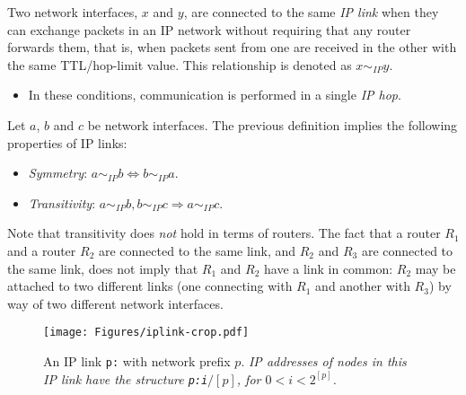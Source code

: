 %
\begin{definition}[IP Link]
Two network interfaces, $x$ and $y$, are connected to the same {\em IP link} when they can exchange packets in an IP network without requiring that any router forwards them, that is, when packets sent from one  are received in the other with the same TTL/hop-limit value. This relationship is denoted as $x \sim_{IP} y$.
\end{definition}
%
\begin{itemize}
\item In these conditions, communication is performed in a single {\em IP hop}.
\end{itemize}


\begin{remark}
Let $a$, $b$ and $c$ be network interfaces. The previous definition implies the following properties of IP links:

\begin{itemize}
\item \emph{Symmetry}: $a \sim_{IP} b \Longleftrightarrow b \sim_{IP} a$.
\item \emph{Transitivity}: $a \sim_{IP} b, b \sim_{IP} c \Longrightarrow a \sim_{IP} c$.
\end{itemize}
\end{remark}

Note that transitivity does {\em not} hold in terms of routers. The fact that a router $R_1$ and a router $R_2$ are connected to the same link, and $R_2$ and $R_3$ are connected to the same link, does not imply that $R_1$ and $R_2$ have a link in common: $R_2$ may be attached to two different links (one connecting with $R_1$ and another with $R_3$) by way of two different network interfaces.

\begin{figure}[htb]	%
\centering
\texttt{[image: Figures/iplink-crop.pdf]} %
\caption{An IP link {\tt p:} with network prefix $p$. \emph{IP addresses of nodes in this IP link have the structure {\tt p:i}$/[p]$, for $0 < i < 2^{[p]}$.}}
\label{f:iplink}
\end{figure}

